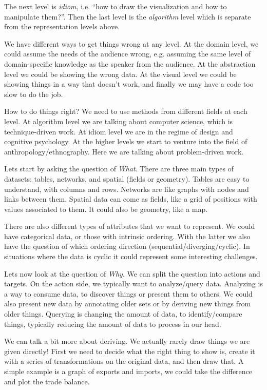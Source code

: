 \documentclass[letterpaper, 11pt]{article}
\numberwithin{equation}{section}
\numberwithin{figure}{section}
\begin{document}
The next level is \emph{idiom}, i.e. ``how to draw the visualization and how to
manipulate them?''. Then the last level is the \emph{algorithm} level which is separate
from the representation levels above.

We have different ways to get things wrong at any level. At the domain level, we
could assume the needs of the audience wrong, e.g. assuming the same level of
domain-specific knowledge as the speaker from the audience. At the abstraction
level we could be showing the wrong data. At the visual level we could be
showing things in a way that doesn't work, and finally we may have a code too
slow to do the job.

How to do things right? We need to use methods from different fields at each
level. At algorithm level we are talking about computer science, which is
technique-driven work. At idiom level we are in the regime of design and
cognitive psychology. At the higher levels we start to venture into the
field of anthropology/ethnography. Here we are talking about problem-driven
work.

Lets start by asking the question of \emph{What}. There are three main types of
datasets: tables, networks, and spatial (fields or geometry). Tables are easy to
understand, with columns and rows. Networks are like graphs with nodes and links
between them. Spatial data can come as fields, like a grid of positions with
values associated to them. It could also be geometry, like a map.

There are also different types of attributes that we want to represent. We
could have categorical data, or those with intrinsic ordering. With the latter
we also have the question of which ordering direction
(sequential/diverging/cyclic). In situations where the data is cyclic it could
represent some interesting challenges.

Lets now look at the question of \emph{Why}. We can split the question into
actions and targets. On the action side, we typically want to analyze/query
data. Analyzing is a way to consume data, to discover things or present them to
others. We could also present new data by annotating older sets or by deriving
new things from older things. Querying is changing the amount of data, to
identify/compare things, typically reducing the amount of data to process in our
head.

We can talk a bit more about deriving. We actually rarely draw things we are
given directly! First we need to decide what the right thing to show is, create
it with a series of transformations on the original data, and then draw that. A
simple example is a graph of exports and imports, we could take the difference
and plot the trade balance.
\end{document}
